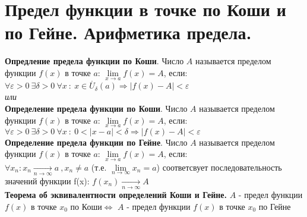 \documentclass[12pt]{article}
\begin{document}
\section{Предел функции в точке по Коши и по Гейне. Арифметика предела.}
\textbf{Опредление предела функции по Коши}. Число $A$ называется пределом функции $f(x)$ в точке $a$: $\lim\limits_{x \to a} f(x) = A$, если: \\
$\forall \varepsilon > 0 \ \exists \delta > 0\ \forall x \ : \ x \in \mathring{U_\delta}(a) \Rightarrow |f(x) - A| < \varepsilon$ \\
\textit{или} \\
\textbf{Определение предела функции по Коши}. Число $A$ называется пределом функции $f(x)$ в точке $a$: $\lim\limits_{x \to a} f(x) = A$, если: \\
$\forall \varepsilon > 0 \ \exists \delta > 0\ \forall x \ : \ 0 < |x - a| < \delta \Rightarrow |f(x) - A| < \varepsilon$ \\
\textbf{Определение предела функции по Гейне}.  Число $A$ называется пределом функции $f(x)$ в точке $a$: $\lim\limits_{x \to a} f(x) = A$, если: \\
$\forall {x_n}: x_n \xrightarrow[n \to \infty]{} a \ ,x_n \neq a$ (т.е. $\lim\limits_{n \to \infty} x_n = a$) соответсвует последовательность значений функции f(x): $f(x_n) \xrightarrow[n \to \infty]{}A$ \\
\textbf{Теорема об эквивалентности определений Коши и Гейне.} $A$ - предел функции $f(x)$ в точке $x_0$ по Коши$ \Leftrightarrow$ $A$ - предел функции $f(x)$ в точке $x_0$ по Гейне
\end{document}
